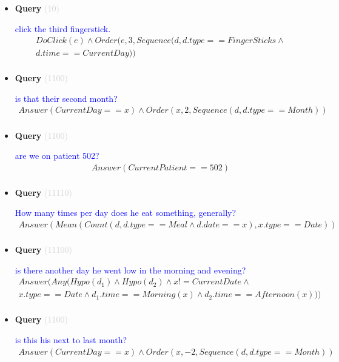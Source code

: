\documentclass[11pt]{article}
\newcommand{\key}[1]{\textcolor{lightgray}{#1}}
\newcounter{CQuery}
\begin{document}
\begin{itemize}
\item
\textbf{Query\theCQuery} \key{(10)} \addtocounter{CQuery}{1}
\textcolor{blue}{ click the third fingerstick. }
\begin{multline*}
DoClick(e) \wedge  Order(e, 3, Sequence(d, d.type==FingerSticks \wedge \\ 
d.time==CurrentDay)) \\ 
\end{multline*}


\item
\textbf{Query\theCQuery} \key{(1100)} \addtocounter{CQuery}{1}
\textcolor{blue}{ is that their second month? }
\begin{multline*}
Answer(CurrentDay==x) \wedge Order(x, 2, Sequence(d, d.type==Month)) \\ 
\end{multline*}


\item
\textbf{Query\theCQuery} \key{(1100)} \addtocounter{CQuery}{1}
\textcolor{blue}{ are we on patient 502? }
\begin{multline*}
Answer(CurrentPatient==502) \\ 
\end{multline*}


\item
\textbf{Query\theCQuery} \key{(11110)} \addtocounter{CQuery}{1}
\textcolor{blue}{ How many times per day does he eat something, generally? }
\begin{multline*}
Answer(Mean(Count(d, d.type==Meal \wedge d.date==x), x.type==Date)) \\ 
\end{multline*}


\item
\textbf{Query\theCQuery} \key{(11100)} \addtocounter{CQuery}{1}
\textcolor{blue}{ is there another day he went low in the morning and evening? }
\begin{multline*}
Answer(Any(Hypo(d_1) \wedge Hypo(d_2) \wedge x != CurrentDate \wedge \\ 
x.type==Date \wedge d_1.time==Morning(x) \wedge d_2.time==Afternoon(x))) \\ 
\end{multline*}


\item
\textbf{Query\theCQuery} \key{(1100)} \addtocounter{CQuery}{1}
\textcolor{blue}{ is this his next to last month? }
\begin{multline*}
Answer(CurrentDay==x) \wedge Order(x, -2, Sequence(d, d.type==Month)) \\ 
\end{multline*}



\end{itemize}
\end{document}
